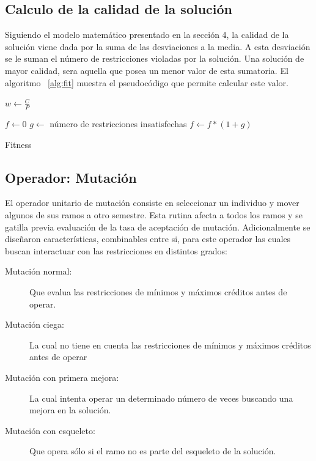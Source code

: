 \documentclass[letter, 10pt]{article}
\begin{document}
\subsection{Calculo de la calidad de la solución}
Siguiendo el modelo matemático presentado en la sección 4, la calidad de la
solución viene dada por la suma de las desviaciones a la media.  A esta
desviación se le suman el número de restricciones violadas por la solución. Una
solución de mayor calidad, sera aquella que posea un menor valor de esta
sumatoria. El algoritmo ~\ref{alg:fit} muestra el pseudocódigo que permite
calcular este valor.

\begin{algorithm}[H]
\SetLine
{}
$w \gets \frac{C}{P}$

$f \gets 0$ \;
$g \gets$ número de restricciones insatisfechas \;
$f \gets f * (1+g)$ \;


\caption{Fitness}
\label{alg:fit}
\end{algorithm}


\subsection{Operador: Mutación}
El operador unitario de mutación consiste en seleccionar un individuo y mover
algunos de sus ramos a otro semestre.  Esta rutina afecta a todos los ramos y se
gatilla previa evaluación de la tasa de aceptación de mutación.
Adicionalmente se diseñaron características, combinables entre si, para este operador las
cuales buscan interactuar con las restricciones en distintos grados:

\begin{description}
\item[Mutación normal:] Que evalua las restricciones de mínimos y
  máximos créditos antes de operar.
\item[Mutación ciega: ] La cual no tiene en cuenta las restricciones de
  mínimos y máximos créditos antes de operar
\item[Mutación con primera mejora:] La cual intenta operar un
  determinado número de veces buscando una mejora en la solución.
\item[Mutación con esqueleto:] Que opera sólo si el ramo no es parte del
  esqueleto de la solución.
\end{description}
\end{document}
